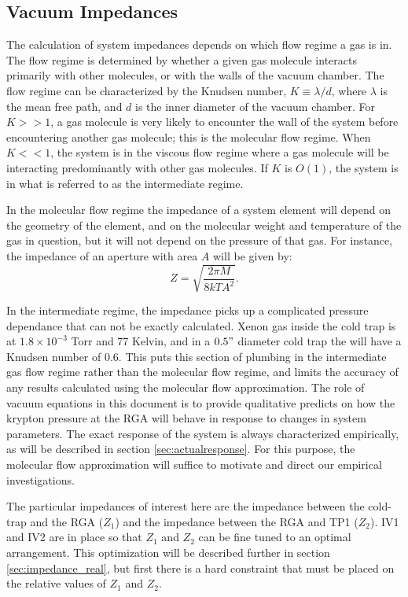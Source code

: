 \subsection{Vacuum Impedances}
The calculation of system impedances depends on which flow regime a gas is in. The flow regime is determined by whether a given gas molecule interacts primarily with other molecules, or with the walls of the vacuum chamber. The flow regime can be characterized by the Knudsen number, $K \equiv \lambda/d$, where $\lambda$ is the mean free path, and $d$ is the inner diameter of the vacuum chamber. For $K>>1$, a gas molecule is very likely to encounter the wall of the system before encountering another gas molecule; this is the molecular flow regime. When $K<<1$, the system is in the viscous flow regime where a gas molecule will be interacting predominantly with other gas molecules. If $K$ is $O(1)$, the system is in what is referred to as the intermediate regime\cite{vac_eq}.

In the molecular flow regime the impedance of a system element will depend on the geometry of the element, and on the molecular weight and temperature of the gas in question, but it will not depend on the pressure of that gas. For instance, the impedance of an aperture with area $A$ will be given by\cite{vac_eq}:
\begin{equation}
\label{eq:aperture}
Z=\sqrt{\frac{2\pi M}{8kTA^{2}}}.
\end{equation}

In the intermediate regime, the impedance picks up a complicated pressure dependance that can not be exactly calculated. Xenon gas inside the cold trap is at $1.8\times 10^{-3}$ Torr and 77 Kelvin\cite{vaporpressure}, and in a $0.5"$ diameter cold trap the will have a Knudsen number of 0.6. This puts this section of plumbing in the intermediate gas flow regime rather than the molecular flow regime, and limits the accuracy of any results calculated using the molecular flow approximation. The role of vacuum equations in this document is to provide qualitative predicts on how the krypton pressure at the RGA will behave in response to changes in system parameters. The exact response of the system is always characterized empirically, as will be described in section \ref{sec:actualresponse}. For this purpose, the molecular flow approximation will suffice to motivate and direct our empirical investigations\cite{vac_eq}.

The particular impedances of interest here are the impedance between the cold-trap and the RGA ($Z_1$) and the impedance between the RGA and TP1 ($Z_2$). IV1 and IV2 are in place so that $Z_1$ and $Z_2$ can be fine tuned to an optimal arrangement. This optimization will be described further in section \ref{sec:impedance_real}, but first there is a hard constraint that must be placed on the relative values of $Z_1$ and $Z_2$.

